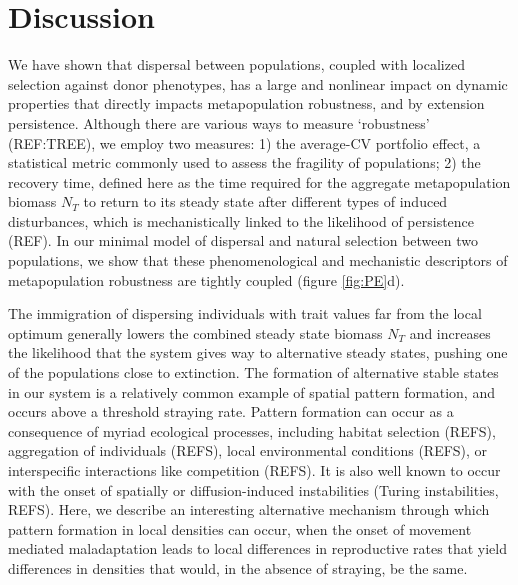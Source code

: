 \documentclass[twocolumn,preprintnumbers,amsmath,amssymb,superscriptaddress]{revtex4}
\begin{document}



\section{Discussion}

We have shown that dispersal between populations, coupled with localized selection against donor phenotypes, has a large and nonlinear impact on dynamic properties that directly impacts metapopulation robustness, and by extension persistence.
Although there are various ways to measure `robustness' (REF:TREE), we employ two measures: 
1) the average-CV portfolio effect, a statistical metric commonly used to assess the fragility of populations; 
2) the recovery time, defined here as the time required for the aggregate metapopulation biomass $N_T$ to return to its steady state after different types of induced disturbances, which is mechanistically linked to the likelihood of persistence (REF).
In our minimal model of dispersal and natural selection between two populations, we show that these phenomenological and mechanistic descriptors of metapopulation robustness are tightly coupled (figure \ref{fig:PE}d).


The immigration of dispersing individuals with trait values far from the local optimum generally lowers the combined steady state biomass $N_T$ and increases the likelihood that the system gives way to alternative steady states, pushing one of the populations close to extinction.
The formation of alternative stable states in our system is a relatively common example of spatial pattern formation, and occurs above a threshold straying rate.
Pattern formation can occur as a consequence of myriad ecological processes, including habitat selection (REFS), aggregation of individuals (REFS), local environmental conditions (REFS), or interspecific interactions like competition (REFS). 
It is also well known to occur with the onset of spatially or diffusion-induced instabilities (Turing instabilities, REFS). 
Here, we describe an interesting alternative mechanism through which pattern formation in local densities can occur, when the onset of movement mediated maladaptation leads to local differences in reproductive rates that yield differences in densities that would, in the absence of straying, be the same. 
\end{document}

